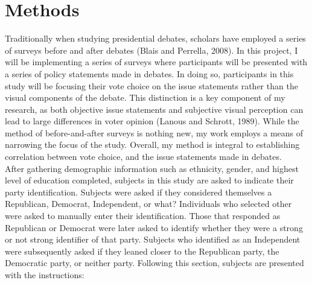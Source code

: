 \documentclass[12pt]{article}
\begin{document}
\section*{Methods}

Traditionally when studying presidential debates, scholars have employed a series of surveys before and after debates (Blais and Perrella, 2008). In this project, I will be implementing a series of surveys where participants will be presented with  a series of policy statements made in debates. In doing so, participants in this study will be focusing their vote choice on the issue statements rather than the visual components of the debate. This distinction is a key component of my research, as both objective issue statements and subjective visual perception can lead to large differences in voter opinion (Lanous and Schrott, 1989). While the method of before-and-after surveys is nothing new, my work employs a means of narrowing the focus of the study. Overall, my method is integral to establishing correlation between vote choice, and the issue statements made in debates.\\

After gathering demographic information such as ethnicity, gender, and highest level of education completed, subjects in this study are asked to indicate their party identification. Subjects were asked if they considered themselves a Republican, Democrat, Independent, or what? Individuals who selected other were asked to manually enter their identification. Those that responded as Republican or Democrat were later asked to identify whether they were a strong or not strong identifier of that party. Subjects who identified as an Independent were subsequently asked if they leaned closer to the Republican party, the Democratic party, or neither party. Following this section, subjects are presented with the instructions:\\
\end{document}

